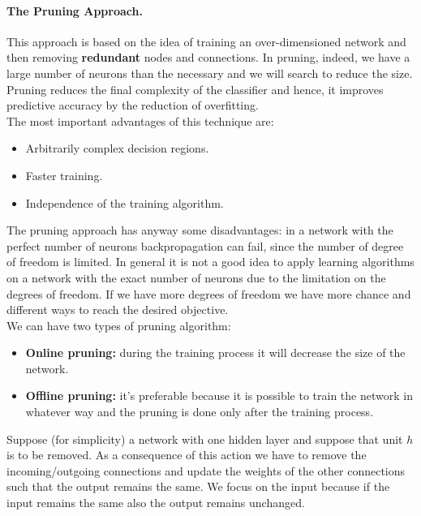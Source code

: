 \paragraph*{The Pruning Approach.} This approach is based on the idea of training an over-dimensioned network and then removing \textbf{redundant} nodes and connections. In pruning, indeed, we have a large number of neurons than the necessary and we will search to reduce the size. Pruning reduces the final complexity of the classifier and hence, it improves predictive accuracy by the reduction of overfitting.\\
The most important advantages of this technique are:
\begin{itemize}
	\item Arbitrarily complex decision regions.
	\item Faster training.
	\item Independence of the training algorithm.
\end{itemize}

The pruning approach has anyway some disadvantages: in a network with the perfect number of neurons backpropagation can fail, since the number of degree of freedom is limited. In general it is not a good idea to apply learning algorithms on a network with the exact number of neurons due to the limitation on the degrees of freedom. If we have more degrees of freedom we have more chance and different ways to reach the desired objective.\\
We can have two types of pruning algorithm:
\begin{itemize}
	\item \textbf{Online pruning:} during the training process it will decrease the size of the network.
	\item \textbf{Offline pruning:} it's preferable because it is possible to train the network in whatever way and the pruning is done only after the training process. 
\end{itemize}
Suppose (for simplicity) a network with one hidden layer and suppose that unit $h$ is to be removed. 
As a consequence of this action we have to remove the incoming/outgoing connections and update the weights of the other connections such that the output remains the same. We focus on the input because if the input remains the same also the output remains unchanged.

